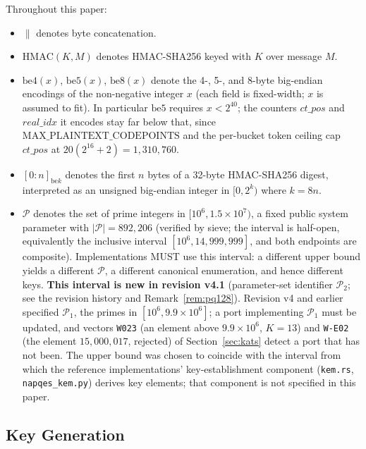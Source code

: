 \documentclass[11pt,a4paper]{article}
\begin{document}
Throughout this paper:
\begin{itemize}
  \item $\|$ denotes byte concatenation.
  \item $\mathrm{HMAC}(K, M)$ denotes HMAC-SHA256 keyed with $K$ over message $M$.
  \item $\mathrm{be4}(x)$, $\mathrm{be5}(x)$, $\mathrm{be8}(x)$ denote the
        4-, 5-, and 8-byte big-endian encodings of the non-negative integer
        $x$ (each field is fixed-width; $x$ is assumed to fit). In
        particular $\mathrm{be5}$ requires $x<2^{40}$; the counters
        $ct\_pos$ and $real\_idx$ it encodes stay far below that, since
        $\mathrm{MAX\_PLAINTEXT\_CODEPOINTS}$ and the per-bucket token
        ceiling cap $ct\_pos$ at $20(2^{16}+2)=1{,}310{,}760$.
  \item $[0{:}n]_{\mathrm{be}k}$ denotes the first $n$ bytes of a 32-byte
        HMAC-SHA256 digest, interpreted as an unsigned big-endian integer
        in $[0,2^{k})$ where $k=8n$.
  \item $\mathcal{P}$ denotes the set of prime integers in $[10^6, 1.5 \times 10^7)$,
        a fixed public system parameter with $|\mathcal{P}| = 892{,}206$
        (verified by sieve; the interval is half-open, equivalently the
        inclusive interval $[10^6, 14{,}999{,}999]$, and both endpoints are
        composite). Implementations MUST use this interval:
        a different upper bound yields a different $\mathcal{P}$, a
        different canonical enumeration, and hence different keys.
        \textbf{This interval is new in revision v4.1} (parameter-set
        identifier $\mathcal{P}_2$; see the revision history and
        Remark~\ref{rem:pq128}). Revision v4 and earlier specified
        $\mathcal{P}_1$, the primes in $[10^6, 9.9\times10^6]$; a port
        implementing $\mathcal{P}_1$ must be updated, and vectors
        \texttt{W023} (an element above $9.9\times10^6$, $K=13$) and
        \texttt{W-E02} (the element $15{,}000{,}017$, rejected) of
        Section~\ref{sec:kats} detect a port that has not been. The upper
        bound was chosen to coincide with the interval from which the
        reference implementations' key-establishment component
        (\texttt{kem.rs}, \texttt{napqes\_kem.py}) derives key elements;
        that component is not specified in this paper.
\end{itemize}

\subsection{Key Generation}
\label{sec:keygen}
\end{document}
